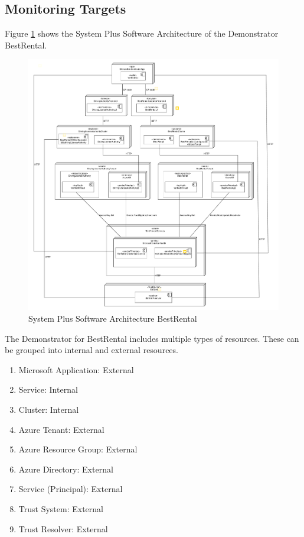 \subsection{Monitoring Targets}

Figure \ref{fig:sps_architecture_bestrental} shows the System Plus Software Architecture of the Demonstrator BestRental.

\begin{figure}
	\centering
	\includegraphics[width=\textwidth]{pdfs/sps_achitecture_bestrental.pdf}
	\caption{System Plus Software Architecture BestRental}
	\label{fig:sps_architecture_bestrental}
\end{figure}

The Demonstrator for BestRental includes multiple types of resources.
These can be grouped into internal and external resources.
\begin{enumerate}
    \item Microsoft Application: External
    \item Service: Internal
    \item Cluster: Internal
    \item Azure Tenant: External
    \item Azure Resource Group: External
    \item Azure Directory: External
    \item Service (Principal): External
    \item Trust System: External
    \item Trust Resolver: External
\end{enumerate}

